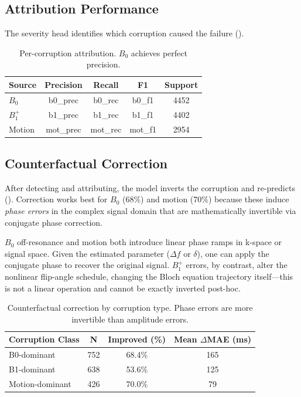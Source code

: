 \documentclass[11pt,a4paper]{article}
\begin{document}
\subsection{Attribution Performance}

The severity head identifies which corruption caused the failure ().

\begin{table}[H]
  \centering
  \caption{Per-corruption attribution. $B_0$ achieves perfect precision.}
  \label{tab:attribution}
  \begin{tabular}{@{}lcccc@{}}
    \toprule
    \textbf{Source} & \textbf{Precision} & \textbf{Recall} & \textbf{F1} & \textbf{Support} \\
    \midrule
    $B_0$ & {{b0_prec}} & {{b0_rec}} & {{b0_f1}} & 4452 \\
    $B_1^+$ & {{b1_prec}} & {{b1_rec}} & {{b1_f1}} & 4402 \\
    Motion & {{mot_prec}} & {{mot_rec}} & {{mot_f1}} & 2954 \\
    \bottomrule
  \end{tabular}
\end{table}

\subsection{Counterfactual Correction}

After detecting and attributing, the model inverts the corruption and re-predicts (). Correction works best for $B_0$ (68\%) and motion (70\%) because these induce \emph{phase errors} in the complex signal domain that are mathematically invertible via conjugate phase correction.

\begin{intuition}
$B_0$ off-resonance and motion both introduce linear phase ramps in k-space or signal space. Given the estimated parameter ($\Delta f$ or $\delta$), one can apply the conjugate phase to recover the original signal. $B_1^+$ errors, by contrast, alter the nonlinear flip-angle schedule, changing the Bloch equation trajectory itself---this is not a linear operation and cannot be exactly inverted post-hoc.
\end{intuition}

\begin{table}[H]
  \centering
  \caption{Counterfactual correction by corruption type. Phase errors are more invertible than amplitude errors.}
  \label{tab:counterfactual}
  \begin{tabular}{@{}lccc@{}}
    \toprule
    \textbf{Corruption Class} & \textbf{N} & \textbf{Improved (\%)} & \textbf{Mean $\Delta$MAE (ms)} \\
    \midrule
    B0-dominant     & 752 & 68.4\% & 165 \\
    B1-dominant     & 638 & 53.6\% & 125 \\
    Motion-dominant & 426 & 70.0\% & 79  \\
    \bottomrule
  \end{tabular}
\end{table}
\end{document}
